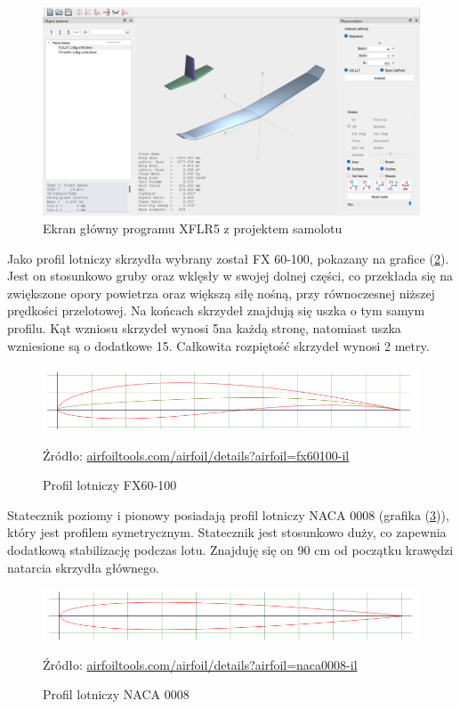 \documentclass[12pt, a4paper]{article}
\let\oldref\ref
\renewcommand{\ref}[1]{(\oldref{#1})}
\begin{document}
 \begin{figure}[ht]
    \centering
    \includegraphics[width=1\textwidth]{xflr}
    \caption{Ekran główny programu XFLR5 z projektem samolotu}
    \label{fig:xflr}
\end{figure}

Jako profil lotniczy skrzydła wybrany został FX 60-100, pokazany na grafice \ref{fig:fx60}. Jest on stosunkowo gruby oraz wklęsły w swojej dolnej części, co przekłada się na zwiększone opory powietrza oraz większą siłę nośną, przy równoczesnej niższej prędkości przelotowej. Na końcach skrzydeł znajdują się uszka o tym samym profilu. Kąt wzniosu skrzydeł wynosi 5\textdegree na każdą stronę, natomiast uszka wzniesione są o dodatkowe 15\textdegree.  Całkowita rozpiętość skrzydeł wynosi 2 metry.

 \begin{figure}[ht]
    \centering
    \includegraphics[width=1\textwidth]{fx60}
    \caption{Profil lotniczy FX60-100}
    \small Źródło: \url{airfoiltools.com/airfoil/details?airfoil=fx60100-il}
    \label{fig:fx60}
\end{figure}

Statecznik poziomy i pionowy posiadają profil lotniczy NACA 0008 (grafika \ref{fig:naca}), który jest profilem symetrycznym. Statecznik jest stosunkowo duży, co zapewnia dodatkową stabilizację podczas lotu. Znajduję się on 90 cm od początku krawędzi natarcia skrzydła głównego.

 \begin{figure}[ht]
    \centering
    \includegraphics[width=1\textwidth]{naca0008}
    \caption{Profil lotniczy NACA 0008}
    \small Źródło: \url{airfoiltools.com/airfoil/details?airfoil=naca0008-il}
    \label{fig:naca}
\end{figure}
\end{document}
